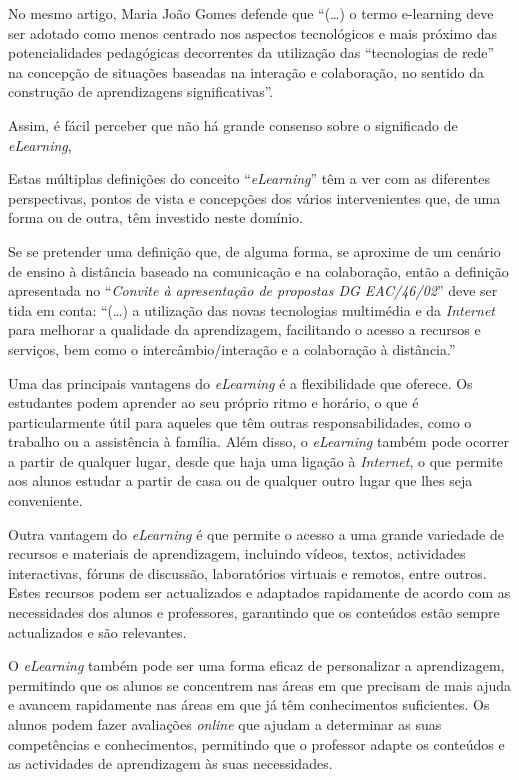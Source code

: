 No mesmo artigo, Maria João Gomes defende que ``(\ldots) o termo e-learning deve ser adotado como menos centrado nos aspectos tecnológicos e mais próximo das potencialidades pedagógicas decorrentes da utilização das ``tecnologias de rede'' na concepção de situações baseadas na interação e colaboração, no sentido da construção de aprendizagens significativas''.

Assim, é fácil perceber que não há grande consenso sobre o significado de \textit{eLearning},

Estas múltiplas definições do conceito ``\textit{eLearning}'' têm a ver com as diferentes perspectivas, pontos de vista e concepções dos vários intervenientes que, de uma forma ou de outra, têm investido neste domínio.

Se se pretender uma definição que, de alguma forma, se aproxime de um cenário de ensino à distância baseado na comunicação e na colaboração\cite{gomes_e-learning_2005}, então a definição apresentada no ``\textit{Convite à apresentação de propostas DG EAC/46/02}'' deve ser tida em conta\cite{comissao197_07}: ``(\ldots) a utilização das novas tecnologias multimédia e da \textit{Internet} para melhorar a qualidade da aprendizagem, facilitando o acesso a recursos e serviços, bem como o intercâmbio/interação e a colaboração à distância.''

Uma das principais vantagens do \textit{eLearning} é a flexibilidade que oferece. Os estudantes podem aprender ao seu próprio ritmo e horário, o que é particularmente útil para aqueles que têm outras responsabilidades, como o trabalho ou a assistência à família. Além disso, o \textit{eLearning} também pode ocorrer a partir de qualquer lugar, desde que haja uma ligação à \textit{Internet}, o que permite aos alunos estudar a partir de casa ou de qualquer outro lugar que lhes seja conveniente.

Outra vantagem do \textit{eLearning} é que permite o acesso a uma grande variedade de recursos e materiais de aprendizagem, incluindo vídeos, textos, actividades interactivas, fóruns de discussão, laboratórios virtuais e remotos, entre outros. Estes recursos podem ser actualizados e adaptados rapidamente de acordo com as necessidades dos alunos e professores, garantindo que os conteúdos estão sempre actualizados e são relevantes.

O \textit{eLearning} também pode ser uma forma eficaz de personalizar a aprendizagem, permitindo que os alunos se concentrem nas áreas em que precisam de mais ajuda e avancem rapidamente nas áreas em que já têm conhecimentos suficientes. Os alunos podem fazer avaliações \textit{online} que ajudam a determinar as suas competências e conhecimentos, permitindo que o professor adapte os conteúdos e as actividades de aprendizagem às suas necessidades.

